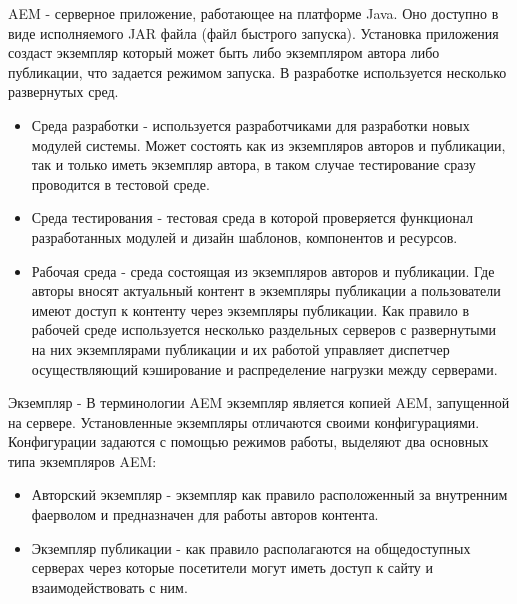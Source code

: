 

AEM - серверное приложение, работающее на платформе Java. Оно доступно в виде исполняемого JAR файла (файл быстрого запуска). Установка приложения создаст экземпляр который может быть либо экземпляром автора либо публикации, что задается режимом запуска. В разработке используется несколько развернутых сред.
\begin{itemize}
\item Среда разработки - используется разработчиками для разработки новых модулей системы. Может состоять как из экземпляров авторов и публикации, так и только иметь экземпляр автора, в таком случае тестирование сразу проводится в тестовой среде.
\item Среда тестирования - тестовая среда в которой проверяется функционал разработанных модулей и дизайн шаблонов, компонентов и ресурсов.
\item Рабочая среда - среда состоящая из экземпляров авторов и публикации. Где авторы вносят актуальный контент в экземпляры публикации а пользователи имеют доступ к контенту через экземпляры публикации. Как правило в рабочей среде используется несколько раздельных серверов с развернутыми на них экземплярами публикации и их работой управляет диспетчер осуществляющий кэширование и распределение нагрузки между серверами.
\end{itemize}

Экземпляр - В терминологии AEM экземпляр является копией AEM, запущенной на сервере. Установленные экземпляры отличаются своими конфигурациями. Конфигурации задаются с помощью режимов работы, выделяют два основных типа экземпляров AEM:
\begin{itemize}
\item Авторский экземпляр - экземпляр как правило расположенный за внутренним фаерволом и предназначен для работы авторов контента. 
\item Экземпляр публикации - как правило располагаются на общедоступных серверах через которые посетители могут иметь доступ к сайту и взаимодействовать с ним.
\end{itemize}

